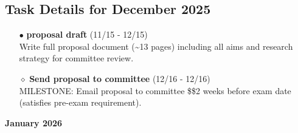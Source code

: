 \documentclass[landscape,a4paper]{article}
\begin{document}
\subsection{Task Details for December 2025}
\begin{itemize}[leftmargin=1cm]
    \item[\textcolor{researchcore}{$\bullet$}] \textbf{proposal draft} (11/15 - 12/15)\\ Write full proposal document (\textasciitilde{}13 pages) including all aims and research strategy for committee review.
    \item[\textcolor{researchcore}{$\diamond$}] \textbf{Send proposal to committee} (12/16 - 12/16)\\ MILESTONE: Email proposal to committee \$\geq\$2 weeks before exam date (satisfies pre-exam requirement).
\end{itemize}

\newpage
\pagestyle{empty}

\begin{center}
{\large\textbf{January 2026}}
\end{center}

\vspace{0.5cm}
\end{document}
